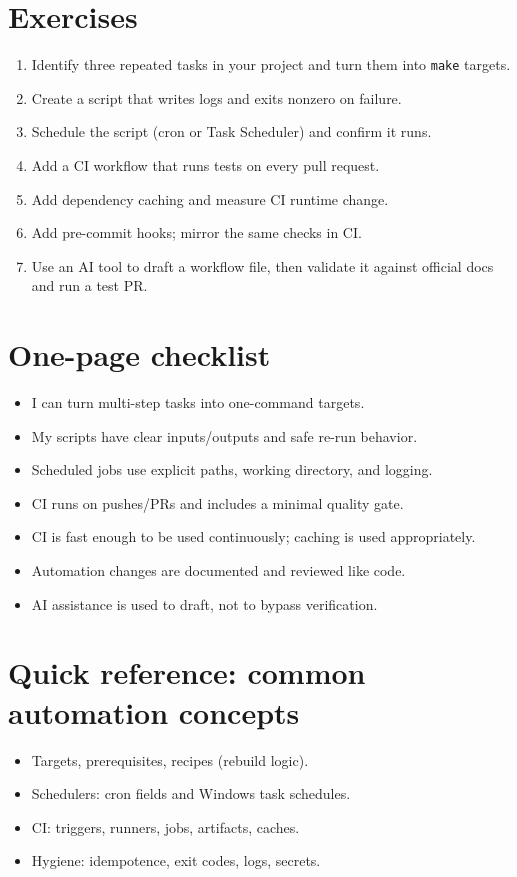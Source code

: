 \section{Exercises}
\begin{enumerate}
\item Identify three repeated tasks in your project and turn them into \texttt{make} targets.
\item Create a script that writes logs and exits nonzero on failure.
\item Schedule the script (cron or Task Scheduler) and confirm it runs.
\item Add a CI workflow that runs tests on every pull request.
\item Add dependency caching and measure CI runtime change.
\item Add pre-commit hooks; mirror the same checks in CI.
\item Use an AI tool to draft a workflow file, then validate it against official docs and run a test PR.
\end{enumerate}

\section{One-page checklist}
\begin{itemize}
\item I can turn multi-step tasks into one-command targets.
\item My scripts have clear inputs/outputs and safe re-run behavior.
\item Scheduled jobs use explicit paths, working directory, and logging.
\item CI runs on pushes/PRs and includes a minimal quality gate.
\item CI is fast enough to be used continuously; caching is used appropriately.
\item Automation changes are documented and reviewed like code.
\item AI assistance is used to draft, not to bypass verification.
\end{itemize}

\section{Quick reference: common automation concepts}
\begin{itemize}
\item Targets, prerequisites, recipes (rebuild logic).
\item Schedulers: cron fields and Windows task schedules.
\item CI: triggers, runners, jobs, artifacts, caches.
\item Hygiene: idempotence, exit codes, logs, secrets.
\end{itemize}
